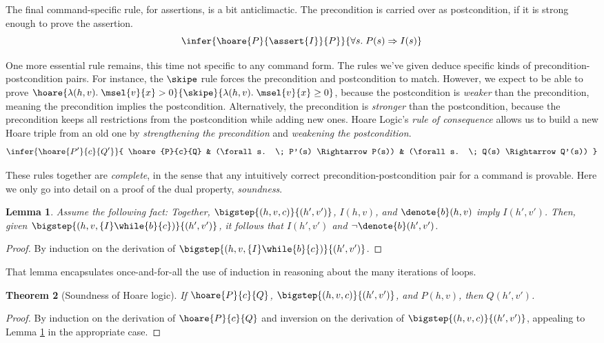 \documentclass{amsbook}
\newtheorem{theorem}{Theorem}[chapter]
\newtheorem{lemma}[theorem]{Lemma}
\theoremstyle{definition}
\theoremstyle{remark}
\numberwithin{section}{chapter}
\numberwithin{equation}{chapter}
\begin{document}
The final command-specific rule, for assertions, is a bit anticlimactic.
The precondition is carried over as postcondition, if it is strong enough to prove the assertion.
$$\infer{\hoare{P}{\assert{I}}{P}}{
  \forall s. \; P(s) \Rightarrow I(s)
}$$

One more essential rule remains, this time not specific to any command form.
The rules we've given deduce specific kinds of precondition-postcondition pairs.
For instance, the $\skipe$ rule forces the precondition and postcondition to match.
However, we expect to be able to prove $\hoare{\lambda (h, v). \; \msel{v}{x} > 0}{\skipe}{\lambda (h, v). \; \msel{v}{x} \geq 0}$, because the postcondition is \emph{weaker} than the precondition, meaning the precondition implies the postcondition.
Alternatively, the precondition is \emph{stronger} than the postcondition, because the precondition keeps all restrictions from the postcondition while adding new ones.
Hoare Logic's \emph{rule of consequence} allows us to build a new Hoare triple from an old one by \emph{strengthening the precondition} and \emph{weakening the postcondition}.
$$\infer{\hoare{P'}{c}{Q'}}{
  \hoare{P}{c}{Q}
  & (\forall s. \; P'(s) \Rightarrow P(s))
  & (\forall s. \; Q(s) \Rightarrow Q'(s))
}$$

These rules together are \emph{complete}, in the sense that any intuitively correct precondition-postcondition pair for a command is provable.
Here we only go into detail on a proof of the dual property, \emph{soundness}.

\begin{lemma}\label{hoare_while}
  Assume the following fact: Together, $\bigstep{(h, v, c)}{(h', v')}$, $I(h, v)$, and $\denote{b}(h, v)$ imply $I(h', v')$.
  Then, given $\bigstep{(h, v, \{I\} \while{b}{c})}{(h', v')}$, it follows that $I(h', v')$ and $\neg \denote{b}(h', v')$.
\end{lemma}
\begin{proof}
  By induction on the derivation of $\bigstep{(h, v, \{I\} \while{b}{c})}{(h', v')}$.
\end{proof}

That lemma encapsulates once-and-for-all the use of induction in reasoning about the many iterations of loops.

\begin{theorem}[Soundness of Hoare logic]
  If $\hoare{P}{c}{Q}$, $\bigstep{(h, v, c)}{(h', v')}$, and $P(h, v)$, then $Q(h', v')$.
\end{theorem}
\begin{proof}
  By induction on the derivation of $\hoare{P}{c}{Q}$ and inversion on the derivation of $\bigstep{(h, v, c)}{(h', v')}$, appealing to Lemma \ref{hoare_while} in the appropriate case.
\end{proof}
\end{document}
